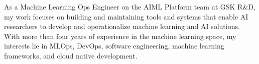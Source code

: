 

\begin{cvparagraph}

As a Machine Learning Ops Engineer on the AIML Platform team at GSK R\&D, my work focuses on building and maintaining tools and systems that enable AI researchers to develop and operationalize machine learning and AI solutions. With more than four years of experience in the machine learning space, my interests lie in MLOps, DevOps, software engineering, machine learning frameworks, and cloud native development.


\end{cvparagraph}
